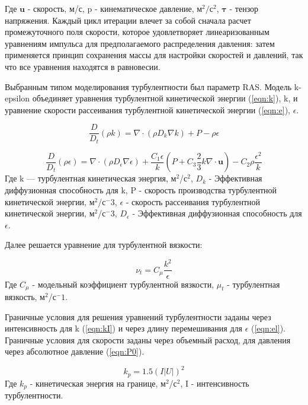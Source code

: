 \documentclass[10pt,a4paper]{book}
\begin{document}
    Где $\bm{u}$ - скорость, м/с, p - кинематическое давление, м$^{2}/$с$^{2}$, $\bm{\tau}$ - тензор напряжения. 
    Каждый цикл итерации влечет за собой сначала расчет промежуточного поля скорости, которое удовлетворяет линеаризованным уравнениям импульса для предполагаемого распределения давления: затем применяется принцип сохранения массы для настройки скоростей и давлений, так что все уравнения находятся в равновесии.
    
    Выбранным типом моделирования турбулентности был параметр RAS. Модель k-epsilon объединяет уравнения турбулентной кинетической энергии (\ref{eqn:k}), k, и уравнение скорости рассеивания турбулентной кинетической энергии (\ref{eqn:e}), $\epsilon$.
    
    \begin{equation}\label{eqn:k}
        \frac{D}{D_{t}}(\rho k) = \nabla \cdot (\rho D_{k}\nabla k) + P - \rho\epsilon
    \end{equation} 
    
    \begin{equation}\label{eqn:e}
        \frac{D}{D_{t}}(\rho\epsilon) = \nabla \cdot (\rho D_{\epsilon}\nabla\epsilon) + \frac{C_{1}\epsilon}{k}(P + C_{3}\frac{2}{3}k\nabla \cdot \bm{u}) - C_{2}\rho\frac{\epsilon^2}{k}
    \end{equation} 
    Где k --- турбулентная кинетическая энергия, м$^2$/с$^2$, $D_{k}$ - Эффективная диффузионная способность для k, P - скорость производства турбулентной кинетической энергии, м$^2$/с$^-3$, $\epsilon$ - скорость рассеивания турбулентной кинетической энергии, м$^2$/с$^-3$, $D_{\epsilon}$ - Эффективная диффузионная способность для $\epsilon$.
    
    Далее решается уравнение для турбулентной вязкости:
    
    \begin{equation}\label{eqn:mu}
        \nu_{t} = C_{\mu}\frac{k^2}{\epsilon}
    \end{equation} 
    Где $C_{\mu}$ - модельный коэффициент турбулентной вязкости, $\mu_{t}$ - турбулентная вязкость, м$^2$/с$^-1$.
    
    Граничные условия для решения уравнений турбулентности заданы через интенсивность для k (\ref{eqn:kI}) и через длину перемешивания для $\epsilon$ (\ref{eqn:el}). Граничные условия для скорости заданы через объемный расход, для давления через абсолютное давление (\ref{eqn:P0}).
    
    \begin{equation}\label{eqn:kI}
        k_{p} = 1.5 (I |U|)^2
    \end{equation}
    Где $k_{p}$ - кинетическая энергия на границе, м$^2$/с$^2$, I - интенсивность турбулентности.
    
\end{document}

